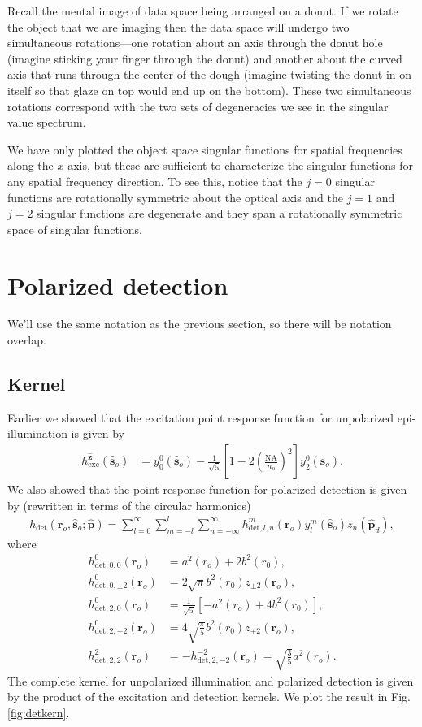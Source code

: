 \documentclass[11pt]{article}
\providecommand{\ro}[1]{\mathbf{\mathbf{r}}_o}
\providecommand{\so}[1]{\mathbf{\hat{s}}_o}
\providecommand{\mh}[1]{\mathbf{\hat{#1}}}
\begin{document}
Recall the mental image of data space being arranged on a donut. If we rotate
the object that we are imaging then the data space will undergo two simultaneous
rotations---one rotation about an axis through the donut hole (imagine sticking
your finger through the donut) and another about the curved axis that runs
through the center of the dough (imagine twisting the donut in on itself so that
glaze on top would end up on the bottom). These two simultaneous rotations
correspond with the two sets of degeneracies we see in the singular value
spectrum.

We have only plotted the object space singular functions for spatial frequencies
along the $x$-axis, but these are sufficient to characterize the singular
functions for any spatial frequency direction. To see this, notice that the
$j=0$ singular functions are rotationally symmetric about the optical axis and
the $j=1$ and $j=2$ singular functions are degenerate and they span a
rotationally symmetric space of singular functions.

\section{Polarized detection}
We'll use the same notation as the previous section, so there will be notation
overlap.

\subsection{Kernel}
Earlier we showed that the excitation point response function for
unpolarized epi-illumination is given by
\begin{align}
  h^{\mh{z}}_{\text{exc}}(\so{}) &= y_0^0(\so{}) - \frac{1}{\sqrt{5}}\left[1 - 2\left(\frac{\text{NA}}{n_o}\right)^2\right]y_2^0(\so{}).
\end{align}
We also showed that the point response function for polarized detection is given
by (rewritten in terms of the circular harmonics)
\begin{align}
  h_{\text{det}}(\ro{}, \so{}; \mh{p}) = \sum_{l=0}^{\infty}\sum_{m=-l}^l\sum_{n=-\infty}^{\infty} h_{\text{det},l,n}^m(\ro{})y_l^m(\so{})z_n(\mh{p}_d), 
\end{align}
where
\begin{align}
  h_{\text{det},0,0}^0(\ro{}) &= a^2(r_o) + 2b^2(r_0),\\
  h_{\text{det},0,\pm 2}^0(\ro{}) &= 2\sqrt{\pi} b^2(r_0)z_{\pm 2}(\ro{}),\\
  h_{\text{det},2,0}^0(\ro{}) &= \frac{1}{\sqrt{5}}\left[-a^2(r_o) + 4b^2(r_0)\right],\\
  h_{\text{det},2,\pm 2}^0(\ro{}) &= 4\sqrt{\frac{\pi}{5}}b^2(r_0)z_{\pm 2}(\ro{}),\\
  h_{\text{det},2,2}^2(\ro{}) &= -h_{\text{det},2,-2}^{-2}(\ro{}) = \sqrt{\frac{3}{5}}a^2(r_o).
\end{align}
The complete kernel for unpolarized illumination and polarized detection is
given by the product of the excitation and detection kernels. We plot the
result in Fig. \ref{fig:detkern}.
\end{document}
